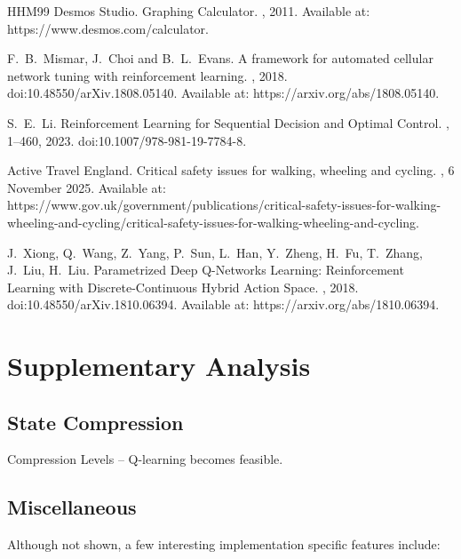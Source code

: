 \documentclass[a4paper]{report}
\begin{document}
\begin{thebibliography}{HHM99}
Desmos Studio.
\newblock Graphing Calculator.
, 2011.
\newblock Available at:
  https://www.desmos.com/calculator.

F.~B.~Mismar, J.~Choi and B.~L.~Evans.
\newblock A framework for automated cellular network tuning with reinforcement learning.
, 2018.
\newblock doi:10.48550/arXiv.1808.05140.
\newblock Available at:
  https://arxiv.org/abs/1808.05140.

S.~E.~Li.
\newblock Reinforcement Learning for Sequential Decision and Optimal Control.
, 1--460, 2023.
\newblock doi:10.1007/978-981-19-7784-8.

Active Travel England.
\newblock Critical safety issues for walking, wheeling and cycling.
, 6 November 2025.
\newblock Available at:
  https://www.gov.uk/government/publications/critical-safety-issues-for-walking-wheeling-and-cycling/critical-safety-issues-for-walking-wheeling-and-cycling.

J.~Xiong, Q.~Wang, Z.~Yang, P.~Sun, L.~Han, Y.~Zheng, H.~Fu, T.~Zhang, J.~Liu, H.~Liu.
\newblock Parametrized Deep Q-Networks Learning: Reinforcement Learning with Discrete-Continuous Hybrid Action Space.
, 2018.
\newblock doi:10.48550/arXiv.1810.06394.
\newblock Available at:
  https://arxiv.org/abs/1810.06394.

\end{thebibliography}

\chapter{Supplementary Analysis}

\section{State Compression}

Compression Levels -- Q-learning becomes feasible.

\section{Miscellaneous}

Although not shown, a few interesting implementation specific features include:
\end{document}

